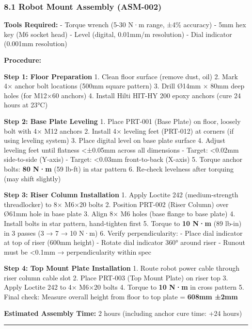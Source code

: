 \documentclass[
]{article}
\begin{document}
\hypertarget{robot-mount-assembly-asm-002}{%
\subsubsection{8.1 Robot Mount Assembly
(ASM-002)}\label{robot-mount-assembly-asm-002}}

\textbf{Tools Required:} - Torque wrench (5-30 N·m range, ±4\% accuracy)
- 5mm hex key (M6 socket head) - Level (digital, 0.01mm/m resolution) -
Dial indicator (0.001mm resolution)

\textbf{Procedure:}

\textbf{Step 1: Floor Preparation} 1. Clean floor surface (remove dust,
oil) 2. Mark 4× anchor bolt locations (500mm square pattern) 3. Drill
Ø14mm × 80mm deep holes (for M12×60 anchors) 4. Install Hilti HIT-HY 200
epoxy anchors (cure 24 hours at 23°C)

\textbf{Step 2: Base Plate Leveling} 1. Place PRT-001 (Base Plate) on
floor, loosely bolt with 4× M12 anchors 2. Install 4× leveling feet
(PRT-012) at corners (if using leveling system) 3. Place digital level
on base plate surface 4. Adjust leveling feet until flatness
\textless±0.05mm across all dimensions - Target: \textless0.02mm
side-to-side (Y-axis) - Target: \textless0.03mm front-to-back (X-axis)
5. Torque anchor bolts: \textbf{80 N·m} (59 lb-ft) in star pattern 6.
Re-check levelness after torquing (may shift slightly)

\textbf{Step 3: Riser Column Installation} 1. Apply Loctite 242
(medium-strength threadlocker) to 8× M6×20 bolts 2. Position PRT-002
(Riser Column) over Ø61mm hole in base plate 3. Align 8× M6 holes (base
flange to base plate) 4. Install bolts in star pattern, hand-tighten
first 5. Torque to \textbf{10 N·m} (89 lb-in) in 3 passes (3 → 7 → 10
N·m) 6. Verify perpendicularity: - Place dial indicator at top of riser
(600mm height) - Rotate dial indicator 360° around riser - Runout must
be \textless0.1mm → perpendicularity within spec

\textbf{Step 4: Top Mount Plate Installation} 1. Route robot power cable
through riser column cable slot 2. Place PRT-003 (Top Mount Plate) on
riser top 3. Apply Loctite 242 to 4× M6×20 bolts 4. Torque to \textbf{10
N·m} in cross pattern 5. Final check: Measure overall height from floor
to top plate = \textbf{608mm ±2mm}

\textbf{Estimated Assembly Time:} 2 hours (including anchor cure time:
+24 hours)

\begin{center}\rule{0.5\linewidth}{0.5pt}\end{center}
\end{document}
